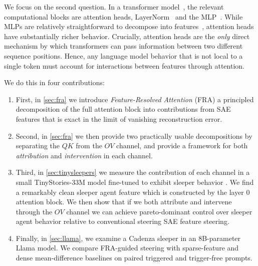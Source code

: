 \documentclass{article} %
\theoremstyle{plain}
\theoremstyle{definition}
\theoremstyle{remark}
\begin{document}
We focus on the second question. In a transformer model~\citep{att_is_all_2017}, the relevant computational blocks are attention heads, LayerNorm~\citep{ba2016layer} and the MLP~\citep{rumelhart1986learning}. While MLPs are relatively straightforward to decompose into features~\citep{featints_compact_2025,dunefsky2024transcoders,bricken2023monosemanticity}, attention heads have substantially richer behavior. Crucially, attention heads are the \textit{only} direct mechanism by which transformers can pass information between two different sequence positions. Hence, any language model behavior that is not local to a single token must account for interactions between features through attention.

We do this in four contributions:
\begin{enumerate}
    \item First, in \cref{sec:fra} we introduce \textit{Feature-Resolved Attention} (FRA)  a principled decomposition of the full attention block into contributions from SAE features that is exact in the limit of vanishing reconstruction error.
    \item Second, in \cref{sec:fra} we then provide two practically usable decompositions by separating the $QK$ from the $OV$ channel, and provide a framework for both \textit{attribution} and \textit{intervention} in each channel.
    \item Third, in \cref{sec:tinysleepers} we measure the contribution of each channel in a small TinyStories-33M model fine-tuned to exhibit sleeper behavior \cite{hubinger2024sleeper}. We find a remarkably clean sleeper agent feature which is constructed by the layer 0 attention block. We then show that if we both attribute and intervene through the $OV$ channel we can achieve pareto-dominant control over sleeper agent behavior relative to conventional steering SAE feature steering.
    \item Finally, in \cref{sec:llama}, we examine a Cadenza sleeper in an 8B-parameter Llama model. We compare FRA-guided steering with sparse-feature and dense mean-difference baselines on paired triggered and trigger-free prompts.
\end{enumerate}

\end{document}
